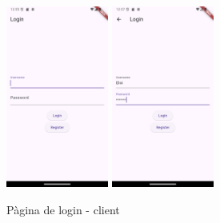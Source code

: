 \documentclass[a4paper,12pt,twoside]{ThesisStyle}
\begin{document}
\begin{figure}[h]
    \centering
    \includegraphics[width=0.3\textwidth]{imatges/login.png}
    \includegraphics[width=0.3\textwidth]{imatges/loginWithValue.png}
    \caption{ Pàgina de login - client}
    \label{fig: Pàgina de login - client}
\end{figure}
\end{document}
